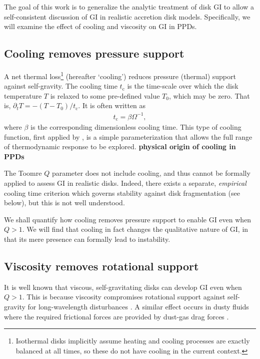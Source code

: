 \documentclass[iop, numberedappendix]{emulateapj}
\newcommand{\p}{\partial}
\newcommand{\tcool}{t_\mathrm{c}}
\begin{document}
The goal of this work is to generalize the analytic treatment of disk 
GI to allow a self-consistent discussion of GI in realistic accretion
disk models. Specifically, we will examine the effect of cooling and
viscosity on GI in PPDs.  


\subsection{Cooling removes pressure support}
A net thermal loss\footnote{Isothermal disks implicitly assume 
  heating and cooling processes are exactly balanced at all
  times, so these do not have cooling in the current context.} (hereafter `cooling')
reduces pressure (thermal) support against self-gravity. The cooling time 
$\tcool$ is the time-scale over which the disk temperature $T$ is relaxed
to some pre-defined value $T_0$, which may be zero. That is, $\p_t T =
-(T-T_0)/\tcool$. It is often written as 
\begin{align} 
  \tcool = \beta \Omega^{-1},
\end{align}
where $\beta$ is the corresponding dimensionless cooling time. This
type of cooling function, first applied by \cite{gammie01}, is a
simple parameterization that allows the full range of thermodynamic
response to be explored. 
{\bf physical origin of cooling in PPDs}

The Toomre $Q$ parameter does not include cooling, and thus cannot be
formally applied to assess GI in realistic disks. Indeed, there exists
a separate, \emph{empirical} cooling time criterion which governs
stability against disk fragmentation (see below), but this is not well
understood.     

We shall quantify how cooling removes pressure
support to enable GI even when $Q>1$. 
We will find that cooling in fact changes the 
qualitative nature of GI, in that its mere presence can
formally lead to instability.  

\subsection{Viscosity removes rotational support}
It is well known that viscous, self-gravitating disks can develop 
GI even when $Q>1$. This is because viscosity compromises rotational
support against self-gravity for long-wavelength disturbances
\citep{lynden-bell74,willerding92,gammie96}. A similar effect 
occurs in dusty fluids where the required frictional forces are 
provided by dust-gas drag forces \citep{youdin11,takahashi14}.
\end{document}
